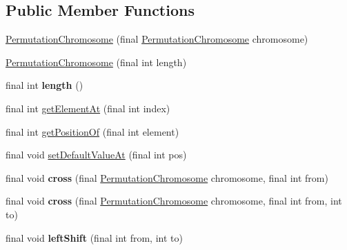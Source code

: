 \subsection*{Public Member Functions}
\begin{DoxyCompactItemize}
\item 
\hyperlink{classjenes_1_1chromosome_1_1_permutation_chromosome_a10cdd7769af8702d9b367b1a7a17214d}{Permutation\-Chromosome} (final \hyperlink{classjenes_1_1chromosome_1_1_permutation_chromosome}{Permutation\-Chromosome} chromosome)
\item 
\hyperlink{classjenes_1_1chromosome_1_1_permutation_chromosome_a7c3b4e904d419c51af512f1f82faa109}{Permutation\-Chromosome} (final int length)
\item 
\hypertarget{classjenes_1_1chromosome_1_1_permutation_chromosome_abbdf232b2c833492472f1c487c23fadd}{final int {\bfseries length} ()}\label{classjenes_1_1chromosome_1_1_permutation_chromosome_abbdf232b2c833492472f1c487c23fadd}

\item 
final int \hyperlink{classjenes_1_1chromosome_1_1_permutation_chromosome_a8c2aee80f46c4634d6797a346a6560cc}{get\-Element\-At} (final int index)
\item 
final int \hyperlink{classjenes_1_1chromosome_1_1_permutation_chromosome_a0c8a75c9417def5db8724d22aadf0303}{get\-Position\-Of} (final int element)
\item 
final void \hyperlink{classjenes_1_1chromosome_1_1_permutation_chromosome_a10210f11733f4d94e2743112179a2bf6}{set\-Default\-Value\-At} (final int pos)
\item 
\hypertarget{classjenes_1_1chromosome_1_1_permutation_chromosome_a3fda59734f77c447518e49086f7be0c2}{final void {\bfseries cross} (final \hyperlink{classjenes_1_1chromosome_1_1_permutation_chromosome}{Permutation\-Chromosome} chromosome, final int from)}\label{classjenes_1_1chromosome_1_1_permutation_chromosome_a3fda59734f77c447518e49086f7be0c2}

\item 
\hypertarget{classjenes_1_1chromosome_1_1_permutation_chromosome_a19caa5ba36809bcbca85c990741731cb}{final void {\bfseries cross} (final \hyperlink{classjenes_1_1chromosome_1_1_permutation_chromosome}{Permutation\-Chromosome} chromosome, final int from, int to)}\label{classjenes_1_1chromosome_1_1_permutation_chromosome_a19caa5ba36809bcbca85c990741731cb}

\item 
\hypertarget{classjenes_1_1chromosome_1_1_permutation_chromosome_a722e6ef2208337802c0a229b77a56629}{final void {\bfseries left\-Shift} (final int from, int to)}\label{classjenes_1_1chromosome_1_1_permutation_chromosome_a722e6ef2208337802c0a229b77a56629}


\end{DoxyCompactItemize}

